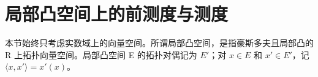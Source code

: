 \section{局部凸空间上的前测度与测度}

本节始终只考虑实数域上的向量空间。所谓局部凸空间，是指豪斯多夫且局部凸的 R 上拓扑向量空间。局部凸空间 E 的拓扑对偶记为 \(E'\)；对 \(x \in E\) 和 \(x' \in E'\)，记 \(\langle x, x' \rangle = x'(x)\)。

